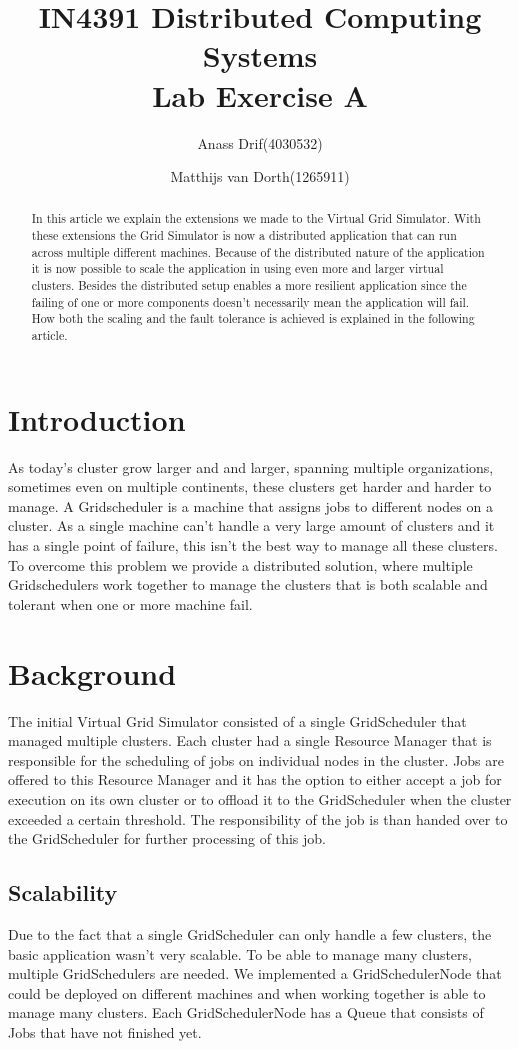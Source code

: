 \documentclass[twocolumn,a4paper]{article}
\title{\textbf{IN4391 Distributed Computing Systems \\ Lab Exercise A}}
\author{Anass Drif(4030532) \and Matthijs van Dorth(1265911)}
\begin{document}
\maketitle


\begin{abstract}
In this article we explain the extensions we made to the Virtual Grid Simulator. With these extensions the Grid Simulator is now a distributed application that can run across multiple different machines. Because of the distributed nature of the application it is now possible to scale the application in using even more and larger virtual clusters. Besides the distributed setup enables a more resilient application since the failing of one or more components doesn't necessarily mean the application will fail. How both the scaling and the fault tolerance is achieved is explained in the following article.
\end{abstract}

\section{Introduction}
As today's cluster grow larger and and larger, spanning multiple organizations, sometimes even on multiple continents, these clusters get harder and harder to manage. A Gridscheduler is a machine that assigns jobs to different nodes on a cluster. As a single machine can't handle a very large amount of clusters and it has a single point of failure, this isn't the best way to manage all these clusters. To overcome this problem we provide a distributed solution, where multiple Gridschedulers work together to manage the clusters that is both scalable and tolerant when one or more machine fail.

\section{Background}
The initial Virtual Grid Simulator consisted of a single GridScheduler that managed multiple clusters. Each cluster had a single Resource Manager that is responsible for the scheduling of jobs on individual nodes in the cluster. Jobs are offered to this Resource Manager and it has the option to either accept a job for execution on its own cluster or to offload it to the GridScheduler when the cluster exceeded a certain threshold. The responsibility of the job is than handed over to the GridScheduler for further processing of this job.

\subsection{Scalability}
Due to the fact that a single GridScheduler can only handle a few clusters, the basic application wasn't very scalable. To be able to manage many clusters, multiple GridSchedulers are needed. We implemented a  GridSchedulerNode that could be deployed on different machines and when working together is able to manage many clusters. Each GridSchedulerNode has a Queue that consists of Jobs that have not finished yet. 
\end{document}
